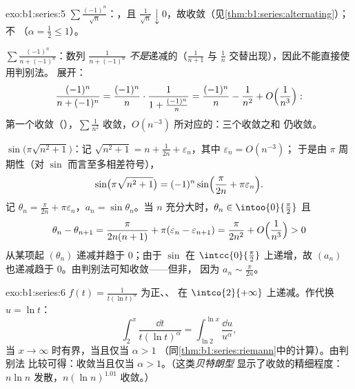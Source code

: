 \begin{solution}{exo:b1:series:5}
$\sum \frac{(-1)^n}{\sqrt n}$：，且 $\frac{1}{\sqrt n}
\downarrow 0$，故收敛（见\cref{thm:b1:series:alternating}）；不
（$\alpha = \frac12 \leq 1$）。

$\sum \frac{(-1)^n}{n + (-1)^n}$：数列 $\frac{1}{n +
(-1)^n}$ \emph{不是}递减的（$\frac{1}{n+1}$ 与
$\frac{1}{n}$ 交替出现），因此不能直接使用判别法。
展开：
\[
\frac{(-1)^n}{n + (-1)^n}
= \frac{(-1)^n}{n}\cdot\frac{1}{1 + \frac{(-1)^n}{n}}
= \frac{(-1)^n}{n} - \frac{1}{n^2} +
O\Bigl(\frac{1}{n^3}\Bigr):
\]
第一个收敛（），$\sum \frac{1}{n^2}$
收敛，$O(n^{-3})$ 所对应的：三个收敛之和
仍收敛。

$\sin\bigl(\pi\sqrt{n^2+1}\bigr)$：记 $\sqrt{n^2 + 1} = n +
\frac{1}{2n} + \varepsilon_n$，其中 $\varepsilon_n = O(n^{-3})$；
于是由 $\pi$ 周期性（对 $\sin$ 而言至多相差符号），
\[
\sin\bigl(\pi\sqrt{n^2+1}\bigr)
= (-1)^n \sin\Bigl(\frac{\pi}{2n} + \pi\varepsilon_n\Bigr) .
\]
记 $\theta_n = \frac{\pi}{2n} + \pi\varepsilon_n$，$a_n =
\sin\theta_n$。当 $n$ 充分大时，$\theta_n \in \intoo{0}{\frac\pi2}$
且
\[
\theta_n - \theta_{n+1} = \frac{\pi}{2n(n+1)} +
\pi(\varepsilon_n - \varepsilon_{n+1})
= \frac{\pi}{2n^2} + O\Bigl(\frac{1}{n^3}\Bigr) > 0
\]
从某项起 $(\theta_n)$ 递减并趋于 $0$；由于 $\sin$ 在
$\intcc{0}{\frac\pi2}$ 上递增，故 $(a_n)$ 也递减趋于
$0$。由判别法可知收敛——但非，
因为 $a_n \sim \frac{\pi}{2n}$。
\end{solution}

\begin{solution}{exo:b1:series:6}
$f(t) = \frac{1}{t(\ln t)^\alpha}$ 为正、、
在 $\intco{2}{+\infty}$ 上递减。作代换 $u = \ln t$：
\[
\int_2^x \frac{\dd t}{t(\ln t)^\alpha}
= \int_{\ln 2}^{\ln x} \frac{\dd u}{u^\alpha},
\]
当 $x \to \infty$ 时有界，当且仅当 $\alpha > 1$
（同\cref{thm:b1:series:riemann}中的计算）。由判别法
比较可得：收敛当且仅当 $\alpha > 1$。（这类\emph{贝特朗型}
显示了收敛的精细程度：$n\ln n$
发散，$n(\ln n)^{1.01}$ 收敛。）
\end{solution}

